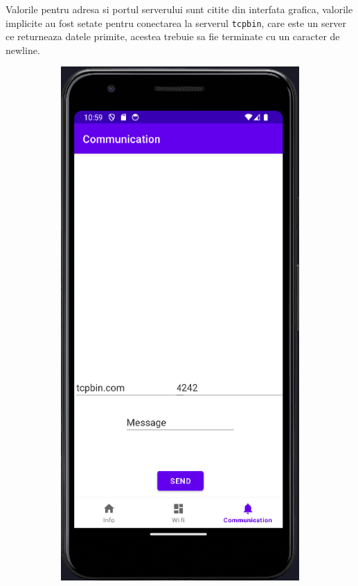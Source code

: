 Valorile pentru adresa si portul serverului sunt citite din interfata grafica, valorile implicite au fost setate pentru conectarea
la serverul \texttt{tcpbin}, care este un server ce returneaza datele primite, acestea trebuie sa fie terminate cu un caracter de newline.

\begin{figure}[H]
    \begin{subfigure}{0.5\textwidth}
        \includegraphics[width=\textwidth]{figs/comm_before.png}

\end{subfigure}
\end{figure}
